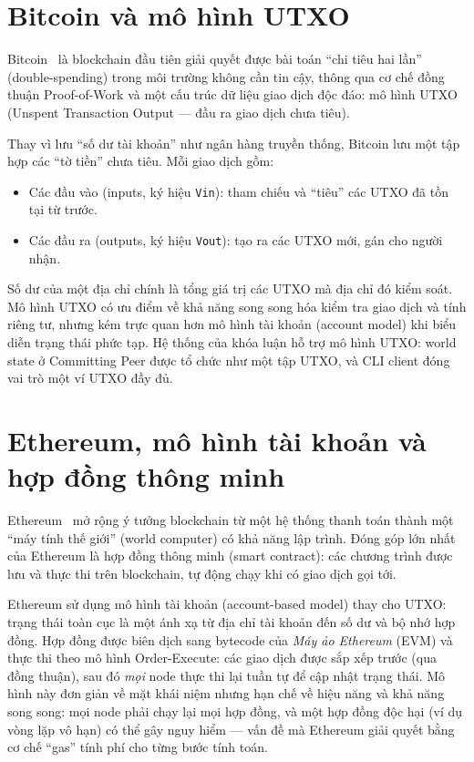 \section{Bitcoin và mô hình UTXO}
\label{sec:bitcoin-utxo}

Bitcoin~\cite{nakamoto2008bitcoin} là blockchain đầu tiên giải quyết được bài
toán ``chi tiêu hai lần'' (double-spending) trong môi trường không cần tin cậy,
thông qua cơ chế đồng thuận Proof-of-Work và một cấu trúc dữ liệu giao dịch độc
đáo: mô hình UTXO (Unspent Transaction Output --- đầu ra giao dịch chưa
tiêu).

Thay vì lưu ``số dư tài khoản'' như ngân hàng truyền thống, Bitcoin lưu một tập
hợp các ``tờ tiền'' chưa tiêu. Mỗi giao dịch gồm:

\begin{itemize}
  \item Các đầu vào (inputs, ký hiệu \texttt{Vin}): tham chiếu và
  ``tiêu'' các UTXO đã tồn tại từ trước.
  \item Các đầu ra (outputs, ký hiệu \texttt{Vout}): tạo ra các UTXO
  mới, gán cho người nhận.
\end{itemize}

Số dư của một địa chỉ chính là tổng giá trị các UTXO mà địa chỉ đó kiểm soát. Mô
hình UTXO có ưu điểm về khả năng song song hóa kiểm tra giao dịch và tính riêng
tư, nhưng kém trực quan hơn mô hình tài khoản (account model) khi biểu diễn
trạng thái phức tạp. Hệ thống của khóa luận hỗ trợ mô hình UTXO: world
state ở Committing Peer được tổ chức như một tập UTXO, và CLI client đóng vai trò
một ví UTXO đầy đủ.

\section{Ethereum, mô hình tài khoản và hợp đồng thông minh}
\label{sec:ethereum}

Ethereum~\cite{buterin2014ethereum,wood2014ethereum} mở rộng ý tưởng blockchain
từ một hệ thống thanh toán thành một ``máy tính thế giới'' (world computer) có
khả năng lập trình. Đóng góp lớn nhất của Ethereum là hợp đồng thông
minh (smart contract): các chương trình được lưu và thực thi trên blockchain,
tự động chạy khi có giao dịch gọi tới.

Ethereum sử dụng mô hình tài khoản (account-based model) thay cho UTXO:
trạng thái toàn cục là một ánh xạ từ địa chỉ tài khoản đến số dư và bộ nhớ hợp
đồng. Hợp đồng được biên dịch sang bytecode của \textit{Máy ảo Ethereum} (EVM)
và thực thi theo mô hình Order-Execute: các giao dịch được sắp xếp
trước (qua đồng thuận), sau đó \textit{mọi} node thực thi lại tuần tự để cập nhật
trạng thái. Mô hình này đơn giản về mặt khái niệm nhưng hạn chế về hiệu năng và
khả năng song song: mọi node phải chạy lại mọi hợp đồng, và một hợp đồng độc hại
(ví dụ vòng lặp vô hạn) có thể gây nguy hiểm --- vấn đề mà Ethereum giải quyết
bằng cơ chế ``gas'' tính phí cho từng bước tính toán.

